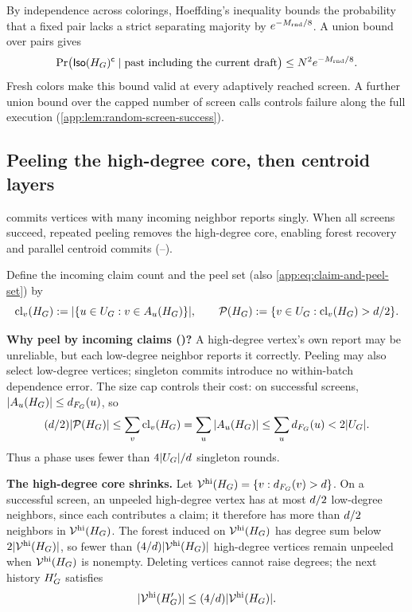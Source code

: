 {By independence across colorings, Hoeffding's inequality bounds the
probability that a fixed pair lacks a strict separating majority by
$e^{-M_{\mathrm{rnd}}/8}$. A union bound over pairs gives
\begin{equation}
 \Pr\bigl(\mathsf{Iso}(H_{G})^{\mathsf c}
       \mid\text{past including the current draft}\bigr)
 \le N^2e^{-M_{\mathrm{rnd}}/8}.
 \label{main:eq:conditional-screen-success}
\end{equation}
Fresh colors make this bound valid at every adaptively reached screen.
A further union bound over the capped number of screen calls controls
failure along the full execution (\cref{app:lem:random-screen-success}).

\subsection{Peeling the high-degree core, then centroid layers}
\label{sec:main-peeling-terminal}

 commits vertices with many incoming neighbor reports singly.
When all screens succeed, repeated peeling removes the high-degree core,
enabling forest recovery and parallel centroid commits
(--).

Define the incoming claim count and the peel set
(also \cref{app:eq:claim-and-peel-set}) by
\begin{equation}
 \operatorname{cl}_{v}(H_{G})
 :=|\{u\in U_{G}:v\in A_{u}(H_{G})\}|,
 \qquad
 \mathcal P(H_{G}):=\{v\in U_{G}:\operatorname{cl}_{v}(H_{G})>d/2\}.
 \label{main:eq:claim-and-peel-set}
\end{equation}

\textbf{Why peel by incoming claims ()?}
A high-degree vertex's own report may be unreliable, but each low-degree
neighbor reports it correctly.
Peeling may also select low-degree vertices; singleton
commits introduce no within-batch dependence error.
The size cap controls their cost: on successful screens,
$|A_{u}(H_{G})|\le d_{F_{G}}(u)$, so
\[
 (d/2)|\mathcal P(H_{G})|
 \le\sum_v\operatorname{cl}_{v}(H_{G})
 =\sum_u|A_{u}(H_{G})|
 \le\sum_u d_{F_{G}}(u)<2|U_{G}|.
\]
Thus a phase uses fewer than $4|U_{G}|/d$
singleton rounds.

\textbf{The high-degree core shrinks.}
Let $\mathcal V^{\mathrm{hi}}(H_{G})=\{v:d_{F_{G}}(v)>d\}$.
On a successful screen, an unpeeled high-degree vertex has at most $d/2$ low-degree
neighbors, since each contributes a claim; it therefore has more than
$d/2$ neighbors in $\mathcal V^{\mathrm{hi}}(H_{G})$.
The forest induced on $\mathcal V^{\mathrm{hi}}(H_{G})$ has degree sum below
$2|\mathcal V^{\mathrm{hi}}(H_{G})|$, so fewer than
$(4/d)|\mathcal V^{\mathrm{hi}}(H_{G})|$ high-degree vertices remain unpeeled
when $\mathcal V^{\mathrm{hi}}(H_{G})$ is nonempty.
Deleting vertices cannot raise degrees; the next history $H_{G}'$ satisfies
\begin{equation}
 |\mathcal V^{\mathrm{hi}}(H_{G}')|
 \le(4/d)|\mathcal V^{\mathrm{hi}}(H_{G})|.
 \label{main:eq:peeling-contraction}
\end{equation}

}

